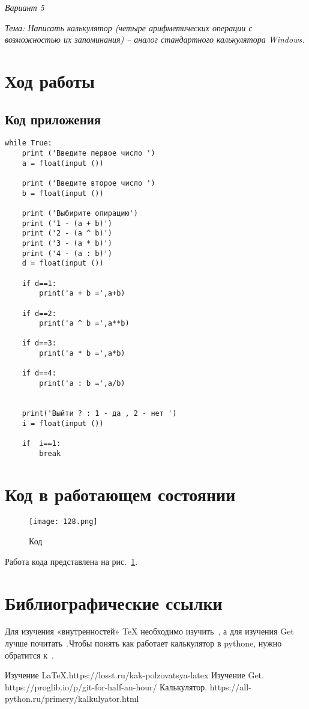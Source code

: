 \documentclass[12pt,a4paper]{scrartcl}
\begin{document}
{\LARGE \textit{Вариант 5}}\bigskip

{\LARGE \textit{Тема: Написать калькулятор (четыре арифметических операции с возможностью их запоминания) – аналог стандартного калькулятора Windows.}}
			
\section{Ход работы}
\label{sec:exp}

\subsection{Код приложения}
\label{sec:exp:code}
\begin{verbatim}
while True:
    print ('Введите первое число ')
    a = float(input ())

    print ('Введите второе число ')
    b = float(input ())

    print ('Выбирите опирацию')
    print ('1 - (a + b)')
    print ('2 - (a ^ b)')
    print ('3 - (a * b)')
    print ('4 - (a : b)')
    d = float(input ())

    if d==1:
        print('а + b =',a+b)

    if d==2:
        print('a ^ b =',a**b)

    if d==3:
        print('a * b =',a*b)

    if d==4:
        print('a : b =',a/b)
        

    print('Выйти ? : 1 - да , 2 - нет ')
    i = float(input ()) 
    
    if  i==1:
        break
\end{verbatim}


\section{Код в работающем состоянии}
\label{sec:picexample}
\begin{figure}[h]
	\centering
	\texttt{[image: 128.png]}
	\caption{Код}\label{fig:par}
\end{figure}
Работа кода представлена на рис.~\ref{fig:par}.

\section{Библиографические ссылки}

Для изучения «внутренностей» \TeX{} необходимо 
изучить~\cite{andreyolegovich}, а для изучения Get лучше
почитать~\cite{proglib.io}.Чтобы понять как работает калькулятор в pythone, нужно обратится к~\cite{youtube}. 

\begin{thebibliography}{9}
Изучение \LaTeX{}.https://losst.ru/kak-polzovatsya-latex
Изучение Get. https://proglib.io/p/git-for-half-an-hour/    
Калькулятор. https://all-python.ru/primery/kalkulyator.html
\end{thebibliography}
\end{document}
